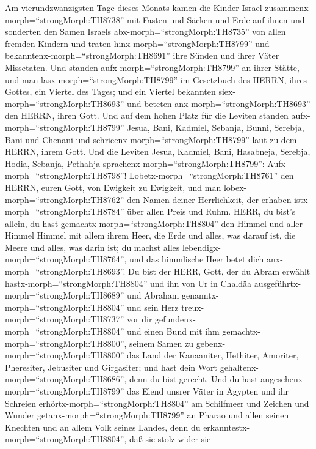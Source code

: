  Am vierundzwanzigsten Tage dieses Monats kamen die Kinder
Israel zusammenx-morph=``strongMorph:TH8738'' mit Fasten und Säcken und
Erde auf ihnen  und sonderten den Samen Israels
abx-morph=``strongMorph:TH8735'' von allen fremden Kindern und traten
hinx-morph=``strongMorph:TH8799'' und
bekanntenx-morph=``strongMorph:TH8691'' ihre Sünden und ihrer Väter
Missetaten.  Und standen aufx-morph=``strongMorph:TH8799''
an ihrer Stätte, und man lasx-morph=``strongMorph:TH8799'' im Gesetzbuch
des HERRN, ihres Gottes, ein Viertel des Tages; und ein Viertel
bekannten siex-morph=``strongMorph:TH8693'' und beteten
anx-morph=``strongMorph:TH8693'' den HERRN, ihren Gott.  Und
auf dem hohen Platz für die Leviten standen
aufx-morph=``strongMorph:TH8799'' Jesua, Bani, Kadmiel, Sebanja, Bunni,
Serebja, Bani und Chenani und schrieenx-morph=``strongMorph:TH8799''
laut zu dem HERRN, ihrem Gott.  Und die Leviten Jesua,
Kadmiel, Bani, Hasabneja, Serebja, Hodia, Sebanja, Pethahja
sprachenx-morph=``strongMorph:TH8799'':
Aufx-morph=``strongMorph:TH8798''! Lobetx-morph=``strongMorph:TH8761''
den HERRN, euren Gott, von Ewigkeit zu Ewigkeit, und man
lobex-morph=``strongMorph:TH8762'' den Namen deiner Herrlichkeit, der
erhaben istx-morph=``strongMorph:TH8784'' über allen Preis und Ruhm.
 HERR, du bist's allein, du hast
gemachtx-morph=``strongMorph:TH8804'' den Himmel und aller Himmel Himmel
mit allem ihrem Heer, die Erde und alles, was darauf ist, die Meere und
alles, was darin ist; du machst alles
lebendigx-morph=``strongMorph:TH8764'', und das himmlische Heer betet
dich anx-morph=``strongMorph:TH8693''.  Du bist der HERR,
Gott, der du Abram erwählt hastx-morph=``strongMorph:TH8804'' und ihn
von Ur in Chaldäa ausgeführtx-morph=``strongMorph:TH8689'' und Abraham
genanntx-morph=``strongMorph:TH8804''  und sein Herz
treux-morph=``strongMorph:TH8737'' vor dir
gefundenx-morph=``strongMorph:TH8804'' und einen Bund mit ihm
gemachtx-morph=``strongMorph:TH8800'', seinem Samen zu
gebenx-morph=``strongMorph:TH8800'' das Land der Kanaaniter, Hethiter,
Amoriter, Pheresiter, Jebusiter und Girgasiter; und hast dein Wort
gehaltenx-morph=``strongMorph:TH8686'', denn du bist gerecht.
 Und du hast angesehenx-morph=``strongMorph:TH8799'' das
Elend unsrer Väter in Ägypten und ihr Schreien
erhörtx-morph=``strongMorph:TH8804'' am Schilfmeer  und
Zeichen und Wunder getanx-morph=``strongMorph:TH8799'' an Pharao und
allen seinen Knechten und an allem Volk seines Landes, denn du
erkanntestx-morph=``strongMorph:TH8804'', daß sie stolz wider sie
